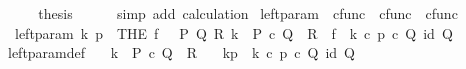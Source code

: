 \begin{isabellebody}
\ \ \isamarkupfalse%
\ \isamarkupfalse%
\ {\isacharquery}{\kern0pt}thesis\isanewline
\ \ \ \ \isamarkupfalse%
\ {\isacharparenleft}{\kern0pt}simp\ add{\isacharcolon}{\kern0pt}\ calculation{\isacharparenright}{\kern0pt}\isanewline
{}\isamarkupfalse%
%
\endisatagproof
{\isafoldproof}%
%
\isadelimproof
%
\endisadelimproof
%
\isadelimdocument
%
\endisadelimdocument
%
\isatagdocument
%
\isamarkuptrue%
%
\endisatagdocument
{\isafolddocument}%
%
\isadelimdocument
%
\endisadelimdocument
{}\isamarkupfalse%
\ left{\isacharunderscore}{\kern0pt}param\ {\isacharcolon}{\kern0pt}{\isacharcolon}{\kern0pt}\ {\isachardoublequoteopen}cfunc\ {\isasymRightarrow}\ cfunc\ {\isasymRightarrow}\ cfunc{\isachardoublequoteclose}\ {\isacharparenleft}{\kern0pt}{\isachardoublequoteopen}{\isacharunderscore}{\kern0pt}\isactrlbsub {\isacharbrackleft}{\kern0pt}{\isacharunderscore}{\kern0pt}{\isacharcomma}{\kern0pt}{\isacharminus}{\kern0pt}{\isacharbrackright}{\kern0pt}\isactrlesub {\isachardoublequoteclose}\ {\isacharbrackleft}{\kern0pt}{}{}{}{\isacharcomma}{\kern0pt}{}{\isacharbrackright}{\kern0pt}{}{}{}{\isacharparenright}{\kern0pt}\ \isanewline
\ \ {\isachardoublequoteopen}left{\isacharunderscore}{\kern0pt}param\ k\ p\ {\isasymequiv}\ {\isacharparenleft}{\kern0pt}THE\ f{\isachardot}{\kern0pt}\ \ {\isasymexists}\ P\ Q\ R{\isachardot}{\kern0pt}\ k\ {\isacharcolon}{\kern0pt}\ P\ {\isasymtimes}\isactrlsub c\ Q\ {\isasymrightarrow}\ R\ {\isasymand}\ f\ {\isacharequal}{\kern0pt}\ k\ {\isasymcirc}\isactrlsub c\ {\isasymlangle}p\ {\isasymcirc}\isactrlsub c\ {\isasymbeta}\isactrlbsub Q\isactrlesub {\isacharcomma}{\kern0pt}\ id\ Q{\isasymrangle}{\isacharparenright}{\kern0pt}{\isachardoublequoteclose}\isanewline
\isanewline
{}\isamarkupfalse%
\ left{\isacharunderscore}{\kern0pt}param{\isacharunderscore}{\kern0pt}def{}{\isacharcolon}{\kern0pt}\isanewline
\ \ \ {\isachardoublequoteopen}k\ {\isacharcolon}{\kern0pt}\ P\ {\isasymtimes}\isactrlsub c\ Q\ {\isasymrightarrow}\ R{\isachardoublequoteclose}\isanewline
\ \ \ {\isachardoublequoteopen}k\isactrlbsub {\isacharbrackleft}{\kern0pt}p{\isacharcomma}{\kern0pt}{\isacharminus}{\kern0pt}{\isacharbrackright}{\kern0pt}\isactrlesub \ {\isasymequiv}\ k\ {\isasymcirc}\isactrlsub c\ {\isasymlangle}p\ {\isasymcirc}\isactrlsub c\ {\isasymbeta}\isactrlbsub Q\isactrlesub {\isacharcomma}{\kern0pt}\ id\ Q{\isasymrangle}{\isachardoublequoteclose}\isanewline

\end{isabellebody}
